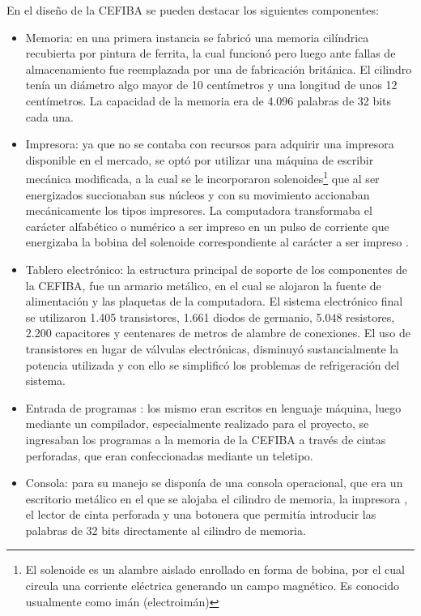 \documentclass[%
 	final,
%
	notitlepage,
	narroweqnarray,
	inline,
 	twoside,
	]{ieee}
\begin{document}
En el dise\~no de la CEFIBA se pueden destacar los siguientes componentes:
\begin{itemize}
\item  Memoria: en una primera instancia se fabric\'o una memoria cil\'indrica recubierta por pintura de ferrita, la cual funcion\'o pero luego ante fallas de almacenamiento fue reemplazada por una de fabricaci\'on brit\'anica. El cilindro ten\'ia un di\'ametro algo mayor de 10 cent\'imetros y una longitud de unos 12 cent\'imetros. La capacidad de la memoria era de 4.096 palabras de 32 bits cada una.

\item Impresora: ya que no se contaba con recursos para adquirir una impresora disponible en el mercado, se opt\'o por utilizar una m\'aquina de escribir mec\'anica modificada, a la cual se le incorporaron solenoides\footnote{El solenoide es un alambre aislado enrollado en forma de bobina, por el cual circula una corriente el\'ectrica generando un campo magn\'etico. Es conocido usualmente como im\'an (electroim\'an)} que al ser energizados succionaban sus n\'ucleos y con su movimiento accionaban mec\'anicamente los tipos impresores. La computadora transformaba el car\'acter alfab\'etico o num\'erico a ser impreso en un pulso de corriente que energizaba la bobina del solenoide correspondiente al car\'acter a ser impreso .

\item Tablero electr\'onico: la estructura principal de soporte de los componentes de la CEFIBA, fue un armario met\'alico, en el cual se alojaron la fuente de alimentaci\'on y las plaquetas de la computadora. El sistema electr\'onico final se utilizaron 1.405 transistores, 1.661 diodos de germanio, 5.048 resistores, 2.200 capacitores y centenares de metros de alambre de conexiones. El uso de transistores en lugar de v\'alvulas electr\'onicas, disminuy\'o sustancialmente la potencia utilizada y con ello se simplific\'o los problemas de refrigeraci\'on del sistema.

\item Entrada de programas : los mismo eran escritos en lenguaje m\'aquina, luego mediante un compilador, especialmente realizado para el proyecto, se ingresaban los programas a la memoria de la CEFIBA a trav\'es de cintas perforadas, que eran confeccionadas mediante un teletipo.

\item Consola: para su manejo se dispon\'ia de una consola operacional, que era un escritorio met\'alico en el que se alojaba el cilindro de memoria, la impresora , el lector de cinta perforada y una botonera que permit\'ia introducir las palabras de 32 bits directamente al cilindro de memoria. 
\end{itemize}
\end{document}
